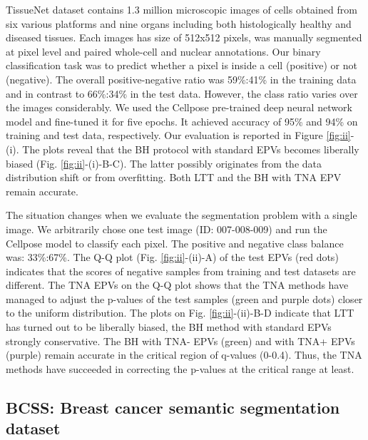 \documentclass{article}
\begin{document}
TissueNet dataset contains 1.3 million microscopic images of cells obtained from six various platforms and nine organs including both histologically healthy and diseased tissues. Each images has size of 512x512 pixels, was manually segmented at pixel level and paired whole-cell and nuclear annotations. Our binary classification task was to predict whether a pixel is inside a cell (positive) or not (negative). The overall positive-negative ratio was 59\%:41\% in the training data and in contrast to 66\%:34\% in the test data. However, the class ratio varies over the images considerably. We used the Cellpose pre-trained deep neural network model \cite{cellpose} and fine-tuned it for five epochs. It achieved accuracy of 95\% and 94\% on training and test data, respectively. Our evaluation is reported in Figure \ref{fig:ii}-(i). The plots reveal that the BH protocol with standard EPVs becomes liberally biased (Fig. \ref{fig:ii}-(i)-B-C). The latter possibly originates from the data distribution shift or from overfitting. Both LTT and the BH with TNA EPV remain accurate. 

The situation changes when we evaluate the segmentation problem with a single image. We arbitrarily chose one test image (ID: 007-008-009) and run the Cellpose model to classify each pixel. The positive and negative class balance was: 33\%:67\%. The Q-Q plot (Fig. \ref{fig:ii}-(ii)-A) of the test EPVs (red dots) indicates that the scores of negative samples from training and test datasets are different. The TNA EPVs on the Q-Q plot shows that the TNA methods have managed to adjust the p-values of the test samples (green and purple dots) closer to the uniform distribution. The plots on Fig. \ref{fig:ii}-(ii)-B-D indicate that LTT has turned out to be liberally biased, the BH method with standard EPVs strongly conservative. The BH with TNA- EPVs (green) and with TNA+ EPVs (purple) remain accurate in the critical region of q-values (0-0.4). Thus, the TNA methods have succeeded in correcting the p-values at the critical range at least. 






\subsection{BCSS: Breast cancer semantic segmentation dataset}
\end{document}
